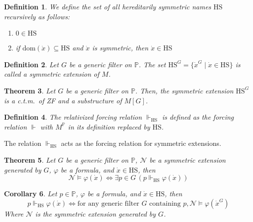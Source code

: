 \documentclass{report}
\newtheorem{thm}{Theorem}[section]
\newtheorem{dfn}[thm]{Definition}
\newtheorem{cor}[thm]{Corollary}
\begin{document}
\begin{dfn} \label{dfn:hereditarily_symmetric}
  We define the set of all hereditarily symmetric names $\mathrm{HS}$ recursively as follows:
  \begin{enumerate}
    \item $0 \in \mathrm{HS}$
    \item if $\mathrm{dom}(\dot{x}) \subseteq \mathrm{HS}$ and $\dot{x}$ is symmetric, then $\dot{x} \in \mathrm{HS}$
  \end{enumerate}
\end{dfn}

\begin{dfn} 
  Let $G$ be a generic filter on $\mathbb{P}$. The set $\mathrm{HS}^{G} = \{ \dot{x}^G \mid \dot{x} \in \mathrm{HS} \}$ is called a \emph{symmetric extension} of $M$.
\end{dfn}

\begin{thm}
  Let $G$ be a generic filter on $\mathbb{P}$. Then, the symmetric extension $\mathrm{HS}^{G}$ is a c.t.m.\  of ZF and a substructure of $M[G]$.
\end{thm}

\begin{dfn}
  The relativized forcing relation $\Vdash_{\mathrm{HS}}$ is defined as the forcing relation $\Vdash$ with $M^{\mathbb{P}}$ in its definition replaced by $\mathrm{HS}$.
\end{dfn}

The relation $\Vdash_{\mathrm{HS}}$ acts as the forcing relation for symmetric extensions.

\begin{thm}\label{thm:symmetry_truth_lemma}
  Let $G$ be a generic filter on $\mathbb{P}$, $\mathcal{N}$ be a symmetric extension generated by $G$, $\varphi$ be a formula, and $\dot{x} \in \mathrm{HS}$, then
  $$\mathcal{N} \vDash \varphi(\dot{x}) \Leftrightarrow \exists p \in G \, (p \Vdash_{\mathrm{HS}} \varphi(\dot{x}))$$
\end{thm}

\begin{cor}\label{cor:symmetry_truth_lemma_cor}
  Let $p \in \mathbb{P}$, $\varphi$ be a formula, and $\dot{x} \in \mathrm{HS}$, then
  $$p \Vdash_{\mathrm{HS}} \varphi(\dot{x}) \Leftrightarrow \text{for any generic filter } G \text{ containing } p, \mathcal{N} \vDash \varphi(\dot{x}^G)$$
  Where $\mathcal{N}$ is the symmetric extension generated by $G$.
\end{cor}
\end{document}

